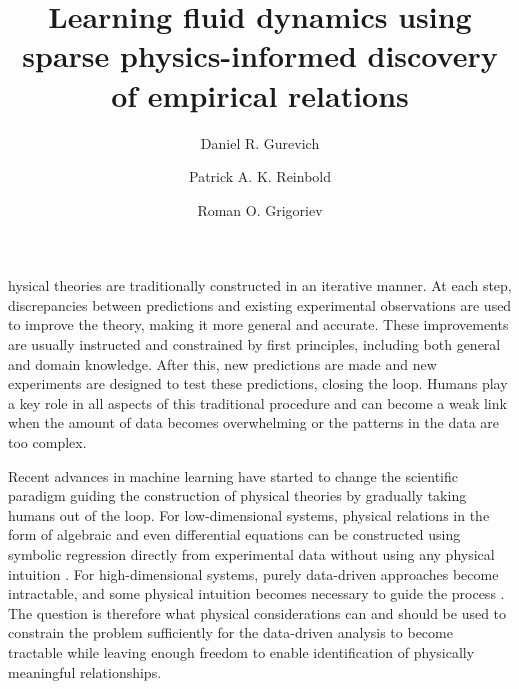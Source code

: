 \documentclass[9pt,twocolumn,twoside,lineno]{pnas-new}
\title{Learning fluid dynamics using sparse physics-informed discovery of empirical relations}
\author[a,1]{Daniel R. Gurevich}
\author[b]{Patrick A. K. Reinbold}
\author[b]{Roman O. Grigoriev}
\affil[a]{Program in Applied and Computational Mathematics, Princeton University, Princeton, NJ 08544}
\affil[b]{School of Physics, Georgia Institute of Technology, Atlanta, GA 30332}
\begin{document}
\maketitle
\thispagestyle{firststyle}


hysical theories are traditionally constructed in an iterative manner. At each step, discrepancies between predictions and existing experimental observations are used to improve the theory, making it more general and accurate. These improvements are usually instructed and constrained by first principles, including both general and domain knowledge. After this, new predictions are made and new experiments are designed to test these predictions, closing the loop. Humans play a key role in all aspects of this traditional procedure and can become a weak link when the amount of data becomes overwhelming or the patterns in the data are too complex. 

Recent advances in machine learning have started to change the scientific paradigm guiding the construction of physical theories by gradually taking humans out of the loop. For low-dimensional systems, physical relations in the form of algebraic and even differential equations can be constructed using symbolic regression directly from experimental data without using any physical intuition \cite{crutchfield1987,bongard2007,schmidt2009}. For high-dimensional systems, purely data-driven approaches become intractable, and some physical intuition becomes necessary to guide the process \cite{karpatne2017}. The question is therefore what physical considerations can and should be used to constrain the problem sufficiently for the data-driven analysis to become tractable while leaving enough freedom to enable identification of physically meaningful relationships.
\end{document}
